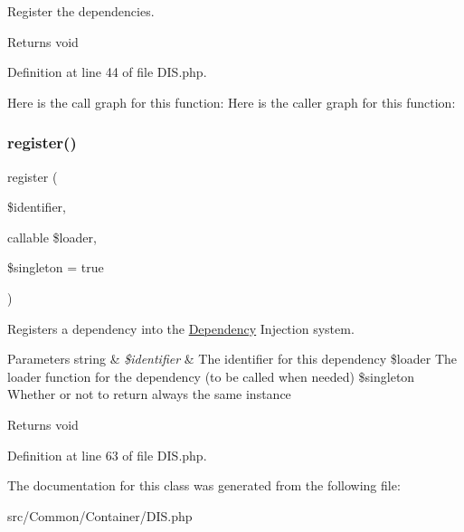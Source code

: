 Register the dependencies.

\begin{DoxyReturn}{Returns}
void 
\end{DoxyReturn}


Definition at line 44 of file D\+I\+S.\+php.

Here is the call graph for this function\+:
Here is the caller graph for this function\+:
\mbox{\label{class_zest_1_1_common_1_1_container_1_1_d_i_s_ab63ad3db9459165e573f406c9df125fc}} 
\subsubsection{\texorpdfstring{register()}{register()}}
{\footnotesize\ttfamily register (\begin{DoxyParamCaption}\item[{}]{\$identifier,  }\item[{callable}]{\$loader,  }\item[{}]{\$singleton = {\ttfamily true} }\end{DoxyParamCaption})}

Registers a dependency into the \mbox{\hyperlink{class_zest_1_1_common_1_1_container_1_1_dependency}{Dependency}} Injection system.


\begin{DoxyParams}[1]{Parameters}
string & {\em \$identifier} & The identifier for this dependency \$loader The loader function for the dependency (to be called when needed) \$singleton Whether or not to return always the same instance\\
\hline
\end{DoxyParams}
\begin{DoxyReturn}{Returns}
void 
\end{DoxyReturn}


Definition at line 63 of file D\+I\+S.\+php.



The documentation for this class was generated from the following file\+:\begin{DoxyCompactItemize}
\item 
src/\+Common/\+Container/D\+I\+S.\+php\end{DoxyCompactItemize}
